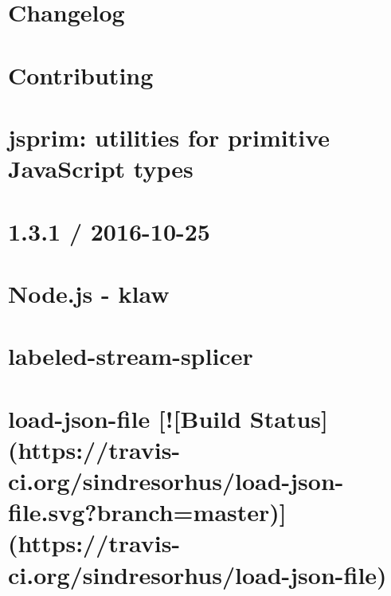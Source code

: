 \documentclass[twoside]{book}
\newcommand{\+}{\discretionary{\mbox{\scriptsize$\hookleftarrow$}}{}{}}
\begin{document}
\chapter{Changelog}
\label{md_dsmacc_examples_DRmerge_node_modules_jsprim_CHANGES}

\chapter{Contributing}
\label{md_dsmacc_examples_DRmerge_node_modules_jsprim_CONTRIBUTING}

\chapter{jsprim\+: utilities for primitive Java\+Script types}
\label{md_dsmacc_examples_DRmerge_node_modules_jsprim_README}

\chapter{1.3.1 / 2016-\/10-\/25}
\label{md_dsmacc_examples_DRmerge_node_modules_klaw_CHANGELOG}

\chapter{Node.\+js -\/ klaw}
\label{md_dsmacc_examples_DRmerge_node_modules_klaw_README}

\chapter{labeled-\/stream-\/splicer}
\label{md_dsmacc_examples_DRmerge_node_modules_labeled-stream-splicer_readme}

\chapter{load-\/json-\/file \mbox{[}!\mbox{[}Build Status\mbox{]}(https\+://travis-\/ci.org/sindresorhus/load-\/json-\/file.svg?branch=master)\mbox{]}(https\+://travis-\/ci.org/sindresorhus/load-\/json-\/file)}
\label{md_dsmacc_examples_DRmerge_node_modules_load-json-file_readme}

\end{document}
